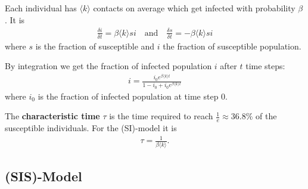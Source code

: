 \documentclass[english]{panikzettel}
\begin{document}
\begin{figure}[ht!]
	\centering
\end{figure}

Each individual has $ \langle k \rangle $ contacts on average which get infected with probability $ \beta $.
It is 
\begin{align*}
	\frac{\delta i}{\delta t} = \beta \langle k \rangle si \quad\text{and}\quad \frac{\delta s}{\delta t} = -\beta \langle k \rangle si
\end{align*}
where $ s $ is the fraction of susceptible and $ i $ the fraction of susceptible population.

By integration we get the fraction of infected population $ i $ after $ t $ time steps:
\begin{align*}
	i = \frac{i_0 e^{\beta \langle k \rangle t}}{1 - i_0 + i_0 e^{\beta \langle k \rangle t}}
\end{align*}
where $ i_0 $ is the fraction of infected population at time step 0.

The \textbf{characteristic time} $ \tau $ is the time required to reach $ \frac{1}{e} \approx 36.8\% $ of the susceptible individuals.
For the (SI)-model it is
\begin{align*}
	\tau = \frac{1}{\beta \langle k \rangle}.
\end{align*}

\subsection{(SIS)-Model}
\end{document}
